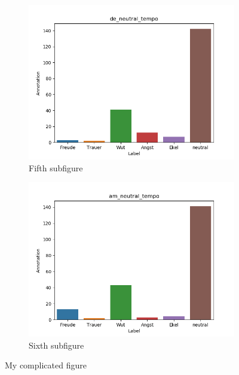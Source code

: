 \documentclass[11pt,a4paper,headsepline,twoside,toc=bibliography]{scrreprt}
\begin{document}
\begin{figure}[t!]
	\medskip
	\begin{subfigure}{0.48\textwidth}
		\includegraphics[width=\linewidth]{plots/de_neutral_tempo.png}
		\caption{Fifth subfigure} \label{fig:de_s_tempo}
	\end{subfigure}\hspace*{\fill}
	\begin{subfigure}{0.48\textwidth}
		\includegraphics[width=\linewidth]{plots/am_neutral_tempo.png}
		\caption{Sixth subfigure} \label{fig:am__s_tempo}
	\end{subfigure}
	
	\caption{My complicated figure} \label{fig:countplots}
\end{figure}
\end{document}
